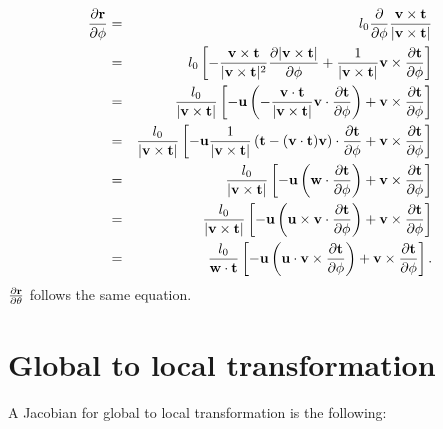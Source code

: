 \documentclass[12pt,a4paper]{scrarticle}
\begin{document}
\begin{eqnarray}\label{eq:drdphi}
    \frac{\partial{\mathbf{r}}}{\partial \phi} & = &  l_0 \frac{\partial}{\partial \phi} \frac{\mathbf{v} \times \mathbf{t}}{|\mathbf{v} \times \mathbf{t}|} \nonumber \\
    & = & l_0 \left[ - \frac{\mathbf{v} \times \mathbf{t}}{|\mathbf{v} \times \mathbf{t}|^2} \frac{\partial |\mathbf{v} \times \mathbf{t}|}{\partial \phi} + \frac{1}{|\mathbf{v} \times \mathbf{t}|} \mathbf{v} \times \frac{\partial \mathbf{t}}{\partial \phi} \right] \nonumber \\
    & = & \frac{l_0}{|\mathbf{v} \times \mathbf{t}|}\left[ -\mathbf{u} \left( -\frac{\mathbf{v} \cdot \mathbf{t}}{|\mathbf{v} \times \mathbf{t}|} \mathbf{v} \cdot \frac{\partial \mathbf{t}}{\partial \phi} \right)  + \mathbf{v} \times \frac{\partial \mathbf{t}}{\partial \phi}  \right] \nonumber \\
    & = & \frac{l_0}{|\mathbf{v} \times \mathbf{t}|}\left[ -\mathbf{u} \frac{1}{|\mathbf{v} \times \mathbf{t}|} \left( \mathbf{t} - (\mathbf{v} \cdot \mathbf{t})\mathbf{v} \right) \cdot \frac{\partial \mathbf{t}}{\partial \phi} + \mathbf{v} \times \frac{\partial \mathbf{t}}{\partial \phi}  \right] \nonumber \\
    & = & \frac{l_0}{|\mathbf{v} \times \mathbf{t}|}\left[ -\mathbf{u} \left( \mathbf{w} \cdot \frac{\partial \mathbf{t}}{\partial \phi} \right)  + \mathbf{v} \times \frac{\partial \mathbf{t}}{\partial \phi}  \right] \nonumber \\
    & = & \frac{l_0}{|\mathbf{v} \times \mathbf{t}|}\left[ -\mathbf{u} \left( \mathbf{u} \times \mathbf{v} \cdot \frac{\partial \mathbf{t}}{\partial \phi} \right)  + \mathbf{v} \times \frac{\partial \mathbf{t}}{\partial \phi}  \right] \nonumber \\   
    & = & \frac{l_0}{\mathbf{w} \cdot \mathbf{t}}\left[ -\mathbf{u} \left( \mathbf{u} \cdot \mathbf{v} \times \frac{\partial \mathbf{t}}{\partial \phi} \right)  + \mathbf{v} \times \frac{\partial \mathbf{t}}{\partial \phi}  \right].    
\end{eqnarray}
$\frac{\partial \mathbf{r}}{\partial \theta}$ follows the same equation.

\section{Global to local transformation}

A Jacobian for global to local transformation is the following:
\end{document}
